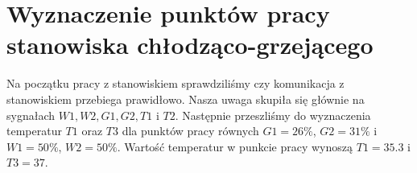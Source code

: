 \chapter{Wyznaczenie punktów pracy stanowiska chłodząco-grzejącego}
\label{thermal_punkty_pracy}
Na początku pracy z stanowiskiem sprawdziliśmy czy komunikacja z stanowiskiem przebiega prawidłowo. Nasza uwaga skupiła się głównie na sygnałach $W1, W2, G1, G2, T1$ i $T2$. Następnie przeszliśmy do wyznaczenia temperatur $T1$ oraz $T3$ dla punktów pracy równych $G1 = 26\%$, $G2 =31\%$ i $W1 = 50\%$, $W2 = 50\%$. Wartość temperatur w punkcie pracy wynoszą $T1 = \num{35.3}$ i $T3 = \num{37}$.


